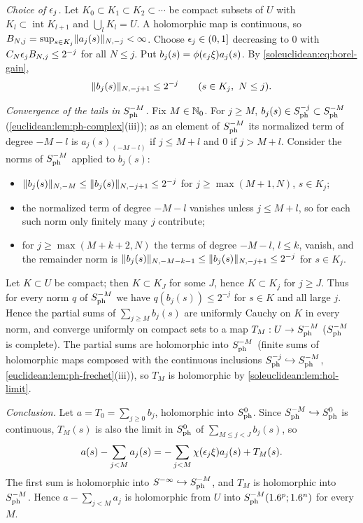 \emph{Choice of $\epsilon_j$.} Let $K_0\subset K_1\subset K_2\subset\cdots$ be compact subsets of $U$ with
$K_l\subset\operatorname{int}K_{l+1}$ and $\bigcup_lK_l=U$. A holomorphic map is continuous,
so $B_{N,j}=\sup_{s\in K_j}\lVert a_j(s)\rVert_{N,-j}<\infty$. Choose $\epsilon_j\in(0,1]$
decreasing to $0$ with $C_N\epsilon_jB_{N,j}\le2^{-j}$ for all $N\le j$. Put
$b_j(s)=\phi(\epsilon_j\xi)a_j(s)$. By \eqref{soleuclidean:eq:borel-gain},
\begin{equation}\label{soleuclidean:eq:tail}
  \lVert b_j(s)\rVert_{N,-j+1}\le2^{-j}\qquad(s\in K_j,\ N\le j).
\end{equation}

\emph{Convergence of the tails in $S^{-M}_{\mathrm{ph}}$.} Fix $M\in\mathbb{N}_0$. For $j\ge M$,
$b_j(s)\in S^{-j}_{\mathrm{ph}}\subset S^{-M}_{\mathrm{ph}}$ (\cref{euclidean:lem:ph-complex}(iii)); as an element of
$S^{-M}_{\mathrm{ph}}$ its normalized term of degree $-M-l$ is $a_j(s)_{(-M-l)}$ if $j\le M+l$ and
$0$ if $j>M+l$. Consider the norms of $S^{-M}_{\mathrm{ph}}$ applied to $b_j(s)$:
\begin{itemize}
\item $\lVert b_j(s)\rVert_{N,-M}\le\lVert b_j(s)\rVert_{N,-j+1}\le2^{-j}$ for $j\ge\max(M+1,N)$, $s\in K_j$;
\item the normalized term of degree $-M-l$ vanishes unless $j\le M+l$, so for each such
  norm only finitely many $j$ contribute;
\item for $j\ge\max(M+k+2,N)$ the terms of degree $-M-l$, $l\le k$, vanish, and the
  remainder norm is
  $\lVert b_j(s)\rVert_{N,-M-k-1}\le\lVert b_j(s)\rVert_{N,-j+1}\le2^{-j}$ for $s\in K_j$.
\end{itemize}
Let $K\subset U$ be compact; then $K\subset K_J$ for some $J$, hence $K\subset K_j$ for
$j\ge J$. Thus for every norm $q$ of $S^{-M}_{\mathrm{ph}}$ we have $q(b_j(s))\le2^{-j}$ for
$s\in K$ and all large $j$. Hence the partial sums of $\sum_{j\ge M}b_j(s)$ are uniformly
Cauchy on $K$ in every norm, and converge uniformly on compact sets to a map
$T_M:U\to S^{-M}_{\mathrm{ph}}$ ($S^{-M}_{\mathrm{ph}}$ is complete). The partial sums are holomorphic into
$S^{-M}_{\mathrm{ph}}$ (finite sums of holomorphic maps composed with the continuous inclusions
$S^{-j}_{\mathrm{ph}}\hookrightarrow S^{-M}_{\mathrm{ph}}$, \cref{euclidean:lem:ph-frechet}(iii)), so $T_M$ is
holomorphic by \cref{soleuclidean:lem:hol-limit}.

\emph{Conclusion.} Let $a=T_0=\sum_{j\ge0}b_j$, holomorphic into $S^{0}_{\mathrm{ph}}$. Since
$S^{-M}_{\mathrm{ph}}\hookrightarrow S^{0}_{\mathrm{ph}}$ is continuous, $T_M(s)$ is also the limit in $S^{0}_{\mathrm{ph}}$ of
$\sum_{M\le j<J}b_j(s)$, so
\begin{equation*}
  a(s)-\sum_{j<M}a_j(s)=-\sum_{j<M}\chi(\epsilon_j\xi)a_j(s)+T_M(s).
\end{equation*}
The first sum is holomorphic into $S^{-\infty}\hookrightarrow S^{-M}_{\mathrm{ph}}$, and $T_M$ is
holomorphic into $S^{-M}_{\mathrm{ph}}$. Hence $a-\sum_{j<M}a_j$ is holomorphic from $U$ into
$S^{-M}_{\mathrm{ph}}(1.6^p;1.6^n)$ for every $M$.

